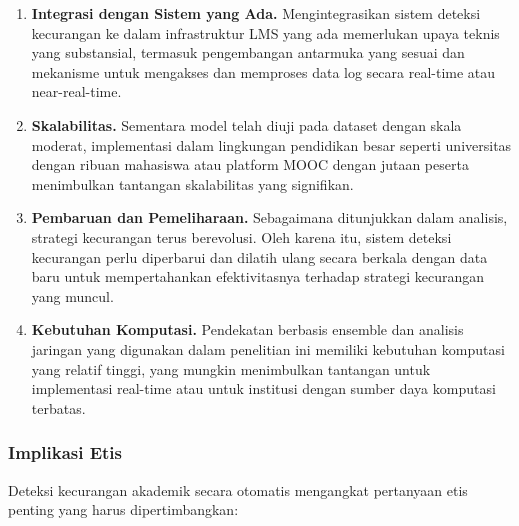 \begin{enumerate}
    \item \textbf{Integrasi dengan Sistem yang Ada.} Mengintegrasikan sistem deteksi kecurangan ke dalam infrastruktur LMS yang ada memerlukan upaya teknis yang substansial, termasuk pengembangan antarmuka yang sesuai dan mekanisme untuk mengakses dan memproses data log secara real-time atau near-real-time.

    \item \textbf{Skalabilitas.} Sementara model telah diuji pada dataset dengan skala moderat, implementasi dalam lingkungan pendidikan besar seperti universitas dengan ribuan mahasiswa atau platform MOOC dengan jutaan peserta menimbulkan tantangan skalabilitas yang signifikan.

    \item \textbf{Pembaruan dan Pemeliharaan.} Sebagaimana ditunjukkan dalam analisis, strategi kecurangan terus berevolusi. Oleh karena itu, sistem deteksi kecurangan perlu diperbarui dan dilatih ulang secara berkala dengan data baru untuk mempertahankan efektivitasnya terhadap strategi kecurangan yang muncul.

    \item \textbf{Kebutuhan Komputasi.} Pendekatan berbasis ensemble dan analisis jaringan yang digunakan dalam penelitian ini memiliki kebutuhan komputasi yang relatif tinggi, yang mungkin menimbulkan tantangan untuk implementasi real-time atau untuk institusi dengan sumber daya komputasi terbatas.
\end{enumerate}

\subsubsection{Implikasi Etis}

Deteksi kecurangan akademik secara otomatis mengangkat pertanyaan etis penting yang harus dipertimbangkan:

